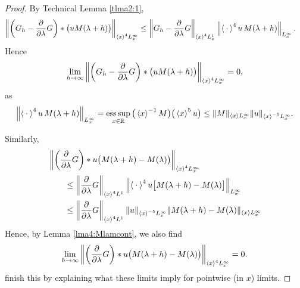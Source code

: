 \documentclass[../dissertation.tex]{subfiles}
\begin{document}
\begin{proof}
	By Technical Lemma \ref{tlma2:1}, 
	\begin{align*}
		\left\|
			\left(G_h - \frac{\partial}{\partial \lambda}G\right)
			* \big( uM(\lambda+h)\big)
		\right\|_{\left\langle x \right\rangle^4L_x^\infty}
			&\leq 
				\left\|
					G_h - \frac{\partial}{\partial \lambda}G
				\right\|_{\left\langle x \right\rangle^4 L_x^1}
				\left\|
					\left\langle \kern 0.5ex \cdot \kern 0.5ex \right\rangle^4
					u\,M(\lambda+h)
				\right\|_{L_x^\infty}.
	\end{align*}
	Hence
	\begin{align} \label{eq3:??}
		\lim_{h\to\infty} 
				\left\|
					\left(G_h - \frac{\partial}{\partial \lambda}G\right)
					* \big( uM(\lambda+h)\big)
				\right\|_{\left\langle x \right\rangle^4 L_x^\infty} 
			= 0,
	\end{align}
	as 
	\begin{align*}
		\left\|
			\left\langle \kern 0.5ex \cdot \kern 0.5ex \right\rangle^4
			u\,M(\lambda+h)
		\right\|_{L_x^\infty}
		=
			\operatorname*{ess\,sup}_{x\in\mathbb R} \big(\left\langle x \right\rangle^{-1} M\big) \big(\left\langle x \right\rangle^5 u\big)
		\leq \|M\|_{\left\langle x \right\rangle L_x^\infty} \|u\|_{\left\langle x \right\rangle^{-5}L_x^\infty}.
	\end{align*}

	Similarly, 
	\begin{align*}
		&
			\left\|
				\left(\frac{\partial}{\partial \lambda} G\right)
				*
				u\big(M(\lambda+h) - M(\lambda)\big)
			\right\|_{\left\langle x \right\rangle^4 L_x^\infty} \\
		&\qquad\leq
			\left\|
				\frac{\partial}{\partial \lambda} G
			\right\|_{\left\langle x \right\rangle^4 L^1}
			\left\|	
				\left\langle \kern 0.5ex \cdot \kern 0.5ex \right\rangle^4 u 
				\big[
					M(\lambda + h) - M(\lambda)
				\big]
			\right\|_{L_x^\infty} 
			\nonumber \\
		&\qquad\leq
			\left\|
				\frac{\partial}{\partial \lambda} G
			\right\|_{\left\langle x \right\rangle^4 L^1}
			\|u\|_{\left\langle x \right\rangle^{-5} L_x^\infty}
			\|M(\lambda+h) - M(\lambda)\|_{\left\langle x \right\rangle L_x^\infty}
			\nonumber
	\end{align*}
	Hence, by Lemma \ref{lma4:Mlamcont}, we also find
	\begin{align}
		\lim_{h\to\infty}
			\left\|
				\left(\frac{\partial}{\partial \lambda} G\right)
				*
				u\big(M(\lambda+h) - M(\lambda)\big)
			\right\|_{\left\langle x \right\rangle^4 L_x^\infty} 
			=0.
	\end{align}
	{\color{red} finish this by explaining what these limits imply 
	for pointwise (in $x$) limits.}
\end{proof}
\end{document}
